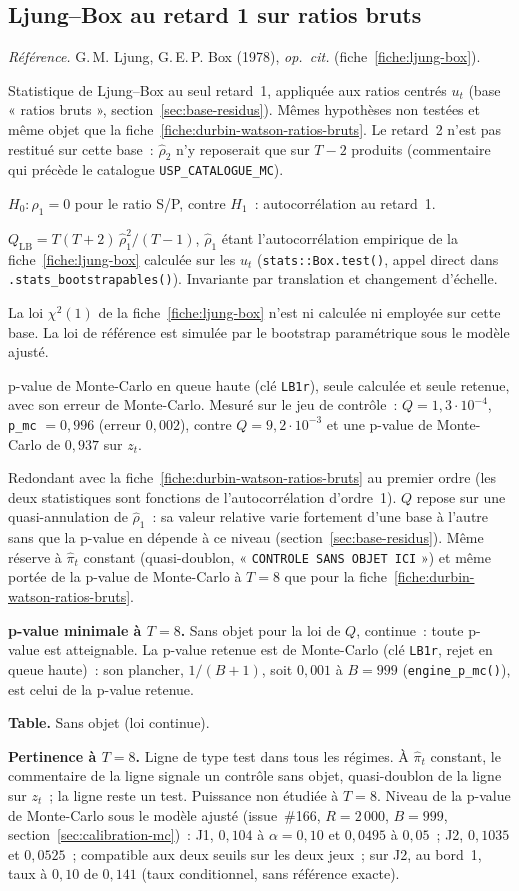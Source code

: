 \documentclass[a4paper,11pt]{article}
\newcommand{\code}[1]{\texttt{\small #1}}
\newcommand{\refl}[1]{{\small\textcolor{maincolor!70!black}{\textit{Référence.} #1}}\par\smallskip}
\newcounter{ficheid}
\newenvironment{fiche}[1]{%
  \stepcounter{ficheid}%
  \phantomsection
  \subsection{#1}%
  \label{fiche:\theficheid}%
}{%
  \end{description}\vspace{0.5em}%
}
\newcommand{\Cadre}{%
  \begin{description}[leftmargin=0pt, style=unboxed, itemsep=3pt, topsep=3pt, parsep=2pt]%
  \item[\textcolor{financeblue}{\textbf{1. Cadre, notations et hypothèses de validité (non testées).}}]}
\newcommand{\Hzero}{\item[\textcolor{financeblue}{\textbf{2. Hypothèse nulle.}}]}
\newcommand{\Stat}{\item[\textcolor{financeblue}{\textbf{3. Statistique de test.}}]}
\newcommand{\Loi}{\item[\textcolor{financeblue}{\textbf{4. Loi sous $H_0$.}}]}
\newcommand{\Pval}{\item[\textcolor{financeblue}{\textbf{5. p-value.}}]}
\newcommand{\Usage}{\item[\textcolor{financeblue}{\textbf{6. Usage et limites.}}]}
\newcommand{\Pertinence}{\item[\textcolor{financeblue}{\textbf{7. Pertinence et puissance à faible $T$.}}]}
\begin{document}
\begin{fiche}{Ljung--Box au retard 1 sur ratios bruts}
\label{fiche:ljung-box-ratios-bruts}%
\refl{G.\,M. Ljung, G.\,E.\,P. Box (1978), \emph{op.\ cit.} (fiche~\ref{fiche:ljung-box}).}
\Cadre
Statistique de Ljung--Box au seul retard~1, appliquée aux ratios centrés $u_t$ (base
« ratios bruts », section~\ref{sec:base-residus}). Mêmes hypothèses non testées et même objet que
la fiche~\ref{fiche:durbin-watson-ratios-bruts}. Le retard~2 n'est pas restitué sur cette base~:
$\hat\rho_2$ n'y reposerait que sur $T-2$ produits (commentaire qui précède le catalogue
\code{USP\_CATALOGUE\_MC}).
\Hzero
$H_0 : \rho_1 = 0$ pour le ratio S/P, contre $H_1$~: autocorrélation au retard~1.
\Stat
$Q_{\mathrm{LB}} = T(T+2)\,\hat\rho_1^2/(T-1)$, $\hat\rho_1$ étant l'autocorrélation empirique de
la fiche~\ref{fiche:ljung-box} calculée sur les $u_t$ (\code{stats::Box.test()}, appel direct
dans \code{.stats\_bootstrapables()}). Invariante par translation et changement d'échelle.
\Loi
La loi $\chi^2(1)$ de la fiche~\ref{fiche:ljung-box} n'est ni calculée ni employée sur cette base.
La loi de référence est simulée par le bootstrap paramétrique sous le modèle ajusté.
\Pval
p-value de Monte-Carlo en queue haute (clé \code{LB1r}), seule calculée et seule retenue, avec
son erreur de Monte-Carlo. Mesuré sur le jeu de contrôle~: $Q = 1{,}3\cdot 10^{-4}$,
\code{p\_mc} $= 0{,}996$ (erreur $0{,}002$), contre $Q = 9{,}2\cdot 10^{-3}$ et une p-value de
Monte-Carlo de $0{,}937$ sur $z_t$.
\Usage
Redondant avec la fiche~\ref{fiche:durbin-watson-ratios-bruts} au premier ordre (les deux
statistiques sont fonctions de l'autocorrélation d'ordre~1). $Q$ repose sur une quasi-annulation
de $\hat\rho_1$~: sa valeur relative varie fortement d'une base à l'autre sans que la p-value en
dépende à ce niveau (section~\ref{sec:base-residus}). Même réserve à $\hat\pi_t$ constant
(quasi-doublon, « \code{CONTROLE SANS OBJET ICI} ») et même portée de la p-value de Monte-Carlo à
$T = 8$ que pour la fiche~\ref{fiche:durbin-watson-ratios-bruts}.
\Pertinence
\textbf{p-value minimale à $T = 8$.} Sans objet pour la loi de $Q$, continue~: toute p-value est atteignable. La p-value retenue est de Monte-Carlo (clé \code{LB1r}, rejet en queue haute)~: son plancher, $1/(B+1)$, soit $0{,}001$ à $B = 999$ (\code{engine\_p\_mc()}), est celui de la p-value retenue.

\textbf{Table.} Sans objet (loi continue).

\textbf{Pertinence à $T = 8$.} Ligne de type test dans tous les régimes. À $\hat\pi_t$ constant, le commentaire de la ligne signale un contrôle sans objet, quasi-doublon de la ligne sur $z_t$~; la ligne reste un test. Puissance non étudiée à $T = 8$. Niveau de la p-value de Monte-Carlo sous le modèle ajusté (issue~\#166, $R = 2\,000$, $B = 999$, section~\ref{sec:calibration-mc})~: J1, $0{,}104$ à $\alpha = 0{,}10$ et $0{,}0495$ à $0{,}05$~; J2, $0{,}1035$ et $0{,}0525$~; compatible aux deux seuils sur les deux jeux~; sur J2, au bord~1, taux à $0{,}10$ de $0{,}141$ (taux conditionnel, sans référence exacte).


\end{fiche}
\end{document}
